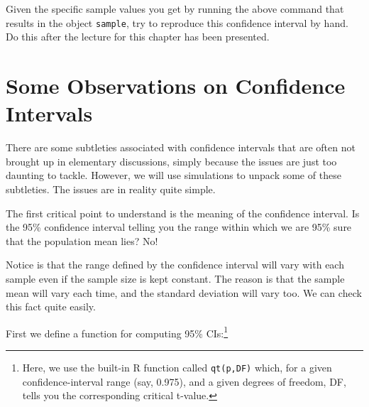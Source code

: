 \documentclass[12pt]{book}\usepackage[]{graphicx}\usepackage[]{color}
\begin{document}

Given the specific sample values you get by running the above command that results in the object \texttt{sample}, try to reproduce this confidence interval by hand.  Do this after the lecture for this chapter has been presented.


\section{Some Observations on Confidence Intervals} \label{confidenceintervals}

\label{trickypoint}
There are some subtleties associated with confidence intervals that
are often not brought up in elementary discussions, simply because the
issues are just too daunting to tackle. However, we will use
simulations to unpack some of these subtleties. The issues are in reality quite simple.

The first critical point to understand is the meaning of the
confidence interval. 
Is the 95\%
confidence interval telling you the range within which we are 95\% sure
that the population mean lies? No!

Notice
is that the range defined by the confidence interval will vary with
each sample even if the sample size is kept constant. The reason is
that the sample mean will vary each time, and the standard deviation will
vary too. We can check this fact quite easily.

First we define a function for computing 95\% CIs:\footnote{Here, we use the built-in R function called \texttt{qt(p,DF)} which, for a given confidence-interval range (say, 0.975), and a given degrees of freedom, DF, tells you the corresponding critical t-value.}
\end{document}
